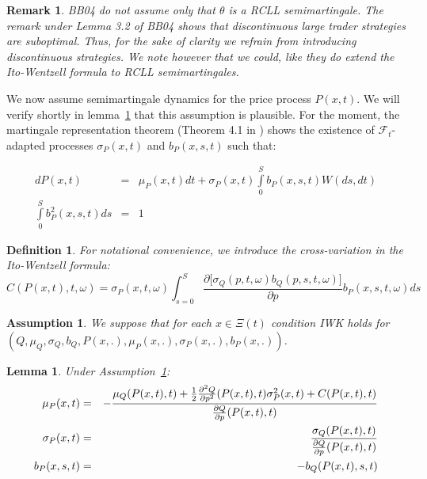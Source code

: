\documentclass{article}
\newtheorem{lemma}[theorem]{Lemma}
\newtheorem{definition}[theorem]{Definition}
\newtheorem{remark}[theorem]{Remark}
\newtheorem{assumption}[theorem]{Assumption}
\begin{document}

\begin{remark}
BB04 do not assume only that $\theta$ is a RCLL semimartingale. The remark
under Lemma 3.2 of BB04 shows that discontinuous large trader strategies are
suboptimal. Thus, for the sake of clarity we refrain from introducing
discontinuous strategies. We note however that we could, like they do extend
the Ito-Wentzell formula to RCLL semimartingales.
\end{remark}

\bigskip

We now assume semimartingale dynamics for the price process $P(x,t)$. We
will verify shortly in lemma~\ref{lemma::para} that this assumption is plausible. For the
moment, the martingale representation theorem (Theorem 4.1 in \cite{CT06})
shows the existence of $\mathcal{F}_{t}$-adapted processes $\sigma _{P}(x,t)$
and $b_{P}(x,s,t)$ such that:

\begin{eqnarray}
dP(x,t) &=&\mu _{P}(x,t)dt+\sigma
_{P}(x,t)\int\limits_{0}^{S}b_{P}(x,s,t)W(ds,dt)  \label{equforP} \\
\int\limits_{0}^{S}b_{P}^{2}(x,s,t)ds &=&1
\end{eqnarray}

\begin{definition}
For notational convenience, we introduce the
cross-variation in the Ito-Wentzell formula:%
\begin{equation*}
C(P(x,t),t,\omega )=\sigma _{P}(x,t,\omega )\int_{s=0}^{S}\frac{\partial
\lbrack \sigma _{Q}(p,t,\omega )b_{Q}(p,s,t,\omega )]}{\partial p}%
b_{P}(x,s,t,\omega )ds
\end{equation*}
\end{definition}

\begin{assumption}\label{ass::iwk_condition_Q}
We suppose that for each $x\in \Xi (t)$ condition IWK holds for $(Q,\mu
_{Q},\sigma _{Q},b_{Q},P(x,.),\mu _{P}(x,.),\sigma _{P}(x,.),b_{P}(x,.))$.
\end{assumption}



\begin{lemma} \label{lemma::para}
Under Assumption~\ref{ass::iwk_condition_Q}:
\begin{eqnarray}
\mu _{P}(x,t) &=&-\frac{\mu _{Q}(P(x,t),t)+\frac{1}{2}\frac{\partial ^{2}Q}{%
\partial p^{2}}(P(x,t),t)\sigma _{P}^{2}(x,t)+C(P(x,t),t)}{\frac{\partial Q}{%
\partial p}(P(x,t),t)}  \label{mu_Px} \\
\sigma _{P}(x,t) &=&\frac{\sigma _{Q}(P(x,t),t)}{\frac{\partial Q}{\partial p%
}(P(x,t),t)}  \label{sigma_P} \\
b_{P}(x,s,t) &=&-b_{Q}(P(x,t),s,t)  \label{b_P}
\end{eqnarray}
\end{lemma}
\end{document}
